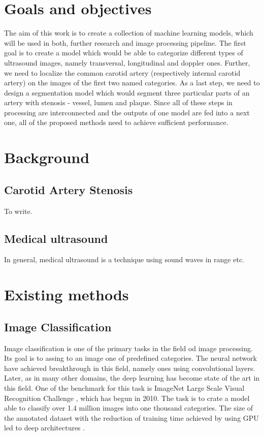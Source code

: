 

\chapter{Goals and objectives}
The aim of this work is to create a collection of machine learning models, which
will be used in both, further research and image processing pipeline. The first
goal is to create a model which would be able to categorize different types of
ultrasound images, namely transversal, longitudinal and doppler ones. Further, 
we need to localize the common carotid artery (respectively internal carotid artery)
on the images of the first two named categories. As a last step, we need to
design a segmentation model which would segment three particular parts of
an artery with stenosis - vessel, lumen and plaque. Since all of these steps
in processing are interconnected and the outputs of one model are fed into a 
next one, all of the proposed methods need to achieve sufficient performance.




\chapter{Background}

\section{Carotid Artery Stenosis}
To write.

\section{Medical ultrasound}
In general, medical ultrasound is a technique using sound waves in range etc.



\chapter{Existing methods}

\section{Image Classification}
Image classification is one of the primary tasks in the field od image processing.
Its goal is to assing to an image one of predefined categories.
The neural network have achieved breakthrough in this field, namely ones using
convolutional layers. Later, as in many other domains, the deep learning has 
become state of the art in this field. One of the benchmark for this task is ImageNet 
Large Scale Visual Recognition Challenge \cite{russakovsky2015imagenet}, which has begun in 2010.
The task is to crate a model able to classify over 1.4 million images into one thousand 
categories. The size of the annotated dataset with the reduction of training time achieved by using GPU led
to deep architectures \cite{AlexNet}.

